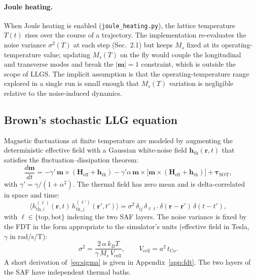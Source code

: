 \documentclass[11pt,a4paper]{article}
\newcommand{\mb}[1]{\mathbf{#1}}
\newcommand{\Heff}{\mb{H}_{\text{eff}}}
\newcommand{\hth}{\mb{h}_{\text{th}}}
\newcommand{\Ms}{M_s}
\newcommand{\Vcell}{V_{\text{cell}}}
\newcommand{\tCo}{t_{\text{Co}}}
\newcommand{\kB}{k_B}
\begin{document}
\paragraph{Joule heating.} When Joule heating is enabled
(\texttt{joule\_heating.py}), the lattice temperature $T(t)$ rises over
the course of a trajectory. The implementation re-evaluates the
noise variance $\sigma^2(T)$ at each step (Sec.~2.1) but keeps $M_s$
fixed at its operating-temperature value; updating $M_s(T)$ on the fly
would couple the longitudinal and transverse modes and break the
$|\mb{m}|=1$ constraint, which is outside the scope of LLGS. The
implicit assumption is that the operating-temperature range explored
in a single run is small enough that $M_s(T)$ variation is negligible
relative to the noise-induced dynamics.

\subsection{Brown's stochastic LLG equation}

Magnetic fluctuations at finite temperature are modeled by augmenting
the deterministic effective field with a Gaussian white-noise field
$\hth(\mb{r}, t)$ that satisfies the fluctuation--dissipation theorem:
%
\begin{equation}\label{eq:sllg}
\frac{d\mb{m}}{dt} = -\gamma' \, \mb{m} \times (\Heff + \hth)
- \gamma' \alpha \, \mb{m} \times \big[\mb{m} \times (\Heff + \hth)\big]
+ \bm{\tau}_{\text{SOT}},
\end{equation}
%
with $\gamma' = \gamma / (1 + \alpha^2)$. The thermal field has zero
mean and is delta-correlated in space and time:
%
\begin{equation}\label{eq:fdt}
\langle h_{\text{th},i}^{(\ell)}(\mb{r}, t)\, h_{\text{th},j}^{(\ell')}(\mb{r}', t') \rangle
= \sigma^2 \, \delta_{ij}\, \delta_{\ell\ell'}\,
\delta(\mb{r} - \mb{r}')\, \delta(t - t'),
\end{equation}
%
with $\ell \in \{\text{top}, \text{bot}\}$ indexing the two SAF
layers. The noise variance is fixed by the FDT in the form
appropriate to the simulator's units (effective field in Tesla,
$\gamma$ in rad/s/T):
%
\begin{equation}\label{eq:sigma}
\boxed{\;
\sigma^2 = \frac{2\, \alpha\, \kB T}{\gamma\, \Ms\, \Vcell},
\qquad
\Vcell = a^2 \, \tCo.
\;}
\end{equation}
%
A short derivation of~\eqref{eq:sigma} is given in
Appendix~\ref{app:fdt}. The two layers of the SAF have independent
thermal baths.
\end{document}
